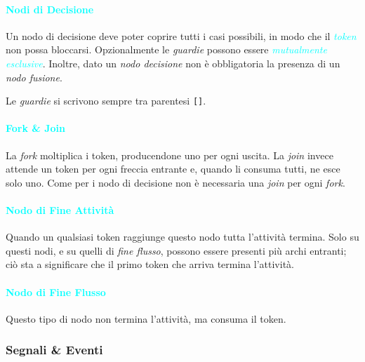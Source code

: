 \paragraph{\textcolor{cyan}{Nodi di Decisione}} Un nodo di decisione deve poter coprire tutti i casi
possibili, in modo che il \emph{\textcolor{cyan}{token}} non possa bloccarsi. Opzionalmente le \emph{guardie}
possono essere \emph{\textcolor{cyan}{mutualmente esclusive}}.
Inoltre, dato un \emph{nodo decisione} non è obbligatoria la presenza di un \emph{nodo fusione}.

Le \emph{guardie} si scrivono sempre tra parentesi \verb|[]|.

\paragraph{\textcolor{cyan}{Fork \& Join}} La \emph{fork} moltiplica i token, producendone
uno per ogni uscita. La \emph{join} invece attende un token per ogni freccia entrante e, quando li consuma tutti, ne esce
solo uno. Come per i nodo di decisione non è necessaria una \emph{join} per ogni \emph{fork}.

\paragraph{\textcolor{cyan}{Nodo di Fine Attività}} Quando un qualsiasi token raggiunge questo nodo
tutta l'attività termina. Solo su questi nodi, e su quelli di \emph{fine flusso}, possono essere presenti più
archi entranti; ciò sta a significare che il primo token che arriva termina l'attività.

\paragraph{\textcolor{cyan}{Nodo di Fine Flusso}} Questo tipo di nodo non termina l'attività, ma consuma il token.

\subsubsection{Segnali \& Eventi}


